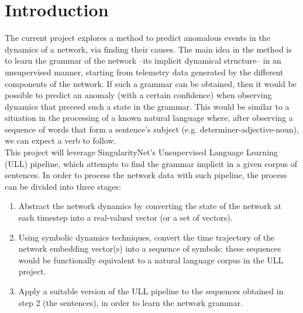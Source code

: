






\newpage
\section{Introduction}

The current project explores a method to predict anomalous events in the dynamics of a network, via finding their causes.
The main idea in the method is to learn the grammar of the network --its implicit dynamical structure-- in an unsupervised manner, starting from telemetry data generated by the different components of the network.
If such a grammar can be obtained, then it would be possible to predict an anomaly (with a certain confidence) when observing dynamics that preceed such a state in the grammar.
This would be similar to a situation in the processing of a known natural language where, after observing a sequence of words that form a sentence's subject (e.g. determiner-adjective-noun), we can expect a verb to follow.\\

This project will leverage SingularityNet's Unsupervised Language Learning (ULL) pipeline, which attempts to find the grammar implicit in a given corpus of sentences.
In order to process the network data with such pipeline, the process can be divided into three stages:
\begin{enumerate}
\item Abstract the network dynamics by converting the state of the network at each timestep into a real-valued vector (or a set of vectors).
\item Using symbolic dynamics techniques, convert the time trajectory of the network embedding vector(s) into a sequence of symbols; these sequences would be functionally equivalent to a natural language corpus in the ULL project.
\item Apply a suitable version of the ULL pipeline to the sequences obtained in step 2 (the sentences), in order to learn the network grammar.
\end{enumerate}

